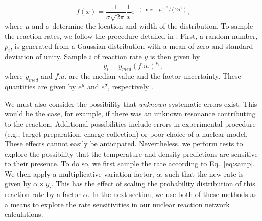 \documentclass[twocolumn]{aastex6}
\begin{document}
\begin{equation}
f(x) = \frac{1}{\sigma\sqrt{2\pi}}\frac{1}{x}e^{-(\ln x-\mu)^2/(2\sigma^2)},
\end{equation}
where $\mu$ and $\sigma$ determine the location and width of the distribution. 
To sample the reaction rates, we follow the procedure detailed in \citet{Iliadis_2015}.
First, a random number, $p_i$, is generated from a Gaussian distribution with a mean of zero and standard deviation of unity. Sample $i$ of reaction rate $y$ is then given by
\begin{equation}
\label{eq:samp}
y_i = y_{med}(f.u.)^{p_i},
\end{equation}
where $y_{med}$ and $f.u.$ are the median value and the factor uncertainty. These quantities are given by $e^\mu$ and $e^\sigma$, respectively \citep{Longland_2012}. 
\par
We must also consider the possibility that \textit{unknown} systematic errors exist.
This would be the case, for example, if there was an unknown resonance contributing to the reaction.
Additional possibilities include errors in experimental procedure (e.g., target preparation, charge collection) or poor choice of a nuclear model. 
These effects cannot easily be anticipated. 
Nevertheless, we perform tests to explore the possibility that the temperature and density predictions are sensitive to their presence. 
To do so, we first sample the rate according to Eq.~\ref{eq:samp}. 
We then apply a multiplicative variation factor, $\alpha$, such that the new rate is given by $\alpha \times y_i$. 
This has the effect of scaling the probability distribution of this reaction rate by a factor $\alpha$. 
In the next section, we use both of these methods as a means to explore the rate sensitivities in our nuclear reaction network calculations.
\end{document}
